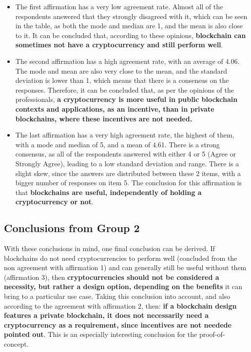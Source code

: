 
\begin{itemize}
    \item The first affirmation has a very low agreement rate. Almost all of the respondents answered that they strongly disagreed with it, which can be seen in the table, as both the mode and median are 1, and the mean is also close to it. It can be concluded that, according to these opinions, \textbf{blockchain can sometimes not have a cryptocurrency and still perform well}.
    \item The second affirmation has a high agreement rate, with an average of 4.06. The mode and mean are also very close to the mean, and the standard deviation is lower than 1, which means that there is a consensus on the responses. Therefore, it can be concluded that, as per the opinions of the professionals, \textbf{a cryptocurrency is more useful in public blockchain contexts and applications, as an incentive, than in private blockchains, where these incentives are not needed.}
    \item The last affirmation has a very high agreement rate, the highest of them, with a mode and median of 5, and a mean of 4.61. There is a strong consensus, as all of the respondents answered with either 4 or 5 (Agree or Strongly Agree), leading to a low standard deviation and range. There is a slight skew, since the answers are distributed between these 2 items, with a bigger number of responses  on item 5. The conclusion for this affirmation is that \textbf{blockchains are useful, independently of holding a cryptocurrency or not}.
\end{itemize}


\subsection*{Conclusions from Group 2}

With these conclusions in mind, one final conclusion can be derived. If blockchains do not need cryptocurrencies to perform well (concluded from the non agreement with affirmation 1) and can generally still be useful without them (affirmation 3), then \textbf{cryptocurrencies should not be considered a necessity, but rather a design option, depending on the benefits} it can bring to a particular use case. Taking this conclusion into account, and also according to the agreement with affirmation 2, then: \textbf{if a blockchain design features a private blockchain, it does not necessarily need a cryptocurrency as a requirement, since incentives are not needede pointed out}. This is an especially interesting conclusion for the proof-of-concept.

